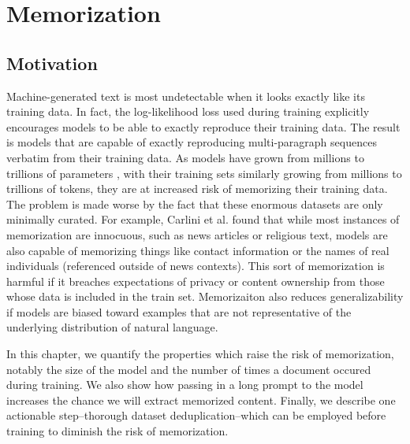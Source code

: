 \newcommand{\Approx}[0]{\textsc{NearDup}}
\newcommand{\Exact}[0]{\textsc{ExactSubstr}}
\newcommand{\Original}[0]{\textsc{Original}}
\newcommand{\pl}[1]{\hl{#1}}


\chapter{Memorization}
\label{chap:memorization}

\section{Motivation}
Machine-generated text is most undetectable when it looks exactly like its training data.
In fact, the log-likelihood loss used during training explicitly encourages models to be able to exactly reproduce their training data.
The result is models that are capable of exactly reproducing multi-paragraph sequences verbatim from their training data.
As models have grown from millions to trillions of parameters \citep{fedus2021switch}, with their training sets similarly growing from millions to trillions of tokens, they  are at increased risk of memorizing their training data.
The problem is made worse by the fact that these enormous datasets are only minimally curated.
For example, Carlini et al. \citep{carlini2020extracting} found that while most instances of memorization are innocuous, such as news articles or religious text, models are also capable of memorizing things like contact information or the names of real individuals (referenced outside of news contexts).
This sort of memorization is harmful if it breaches expectations of privacy or content ownership from those whose data is included in the train set.
Memorizaiton also reduces generalizability if models are biased toward examples that are not representative of the underlying distribution of natural language.

In this chapter, we quantify the properties which raise the risk of memorization, notably the size of the model and the number of times a document occured during training.
We also show how passing in a long prompt to the model increases the chance we will extract memorized content.
Finally, we describe one actionable step--thorough dataset deduplication--which can be employed before training to diminish the risk of memorization.



